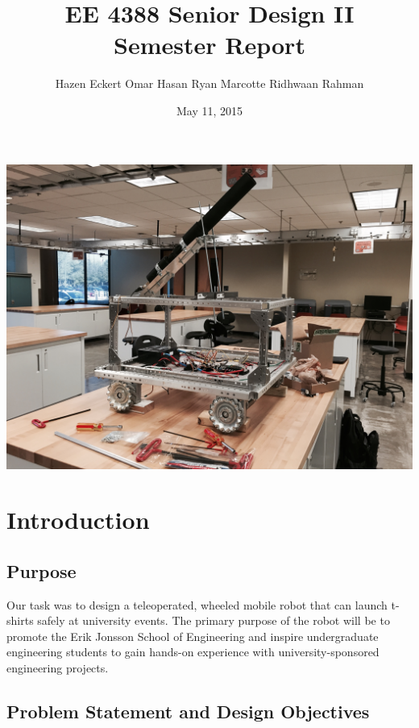 \documentclass[letterpaper,12pt]{article}
\begin{document}
\title{\textbf{EE 4388 Senior Design II\\Semester Report}}
\author{Hazen Eckert \hspace{3mm} Omar Hasan \hspace{3mm} Ryan Marcotte \hspace{3mm} Ridhwaan Rahman}
\date{May 11, 2015}
\maketitle

\begin{center}
    \includegraphics[width=15cm]{./pics/chassis/robot.jpg}
\end{center}

\pagebreak
\tableofcontents
\pagebreak

\section{Introduction}
\label{sec:intro}

\subsection{Purpose}
\label{sec:purpose}
Our task was to design a teleoperated, wheeled mobile robot that can launch
t-shirts safely at university events. The primary purpose of the robot will be
to promote the Erik Jonsson School of Engineering and inspire undergraduate
engineering students to gain hands-on experience with university-sponsored
engineering projects.

\subsection{Problem Statement and Design Objectives}
\label{sec:probstatement}
\end{document}
